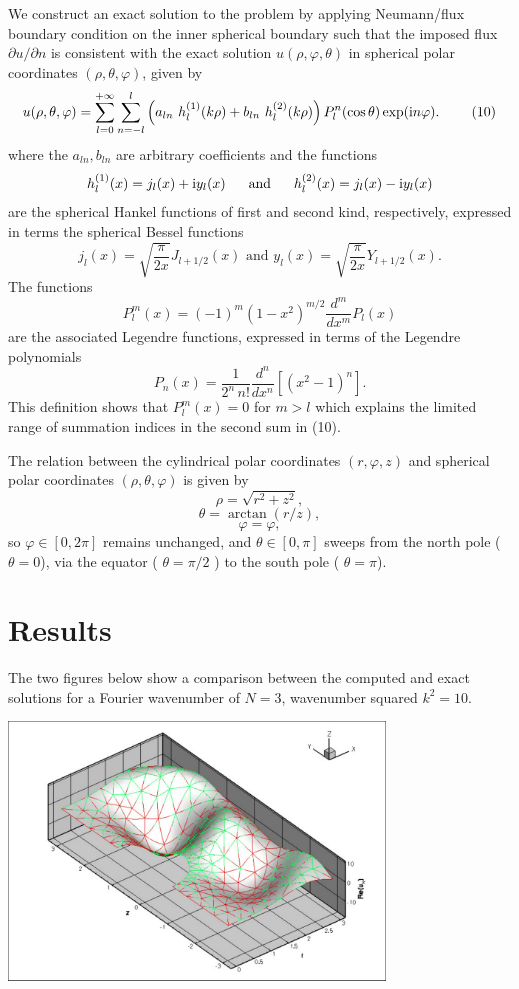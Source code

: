 We construct an exact solution to the problem by applying Neumann/flux boundary condition on the inner spherical boundary such that the imposed flux $ \partial u/\partial n $ is consistent with the exact solution $ u(\rho,\varphi,\theta) $ in spherical polar coordinates $ (\rho,\theta,\varphi) $, given by \[ u(\rho,\theta,\varphi)= \sum_{l=0}^{+\infty}\sum_{n=-l}^{l} \left( a_{ln} \ h_{l}^{(1)}(k\rho)+ b_{ln} \ h_{l}^{(2)}(k\rho) \right)P_{l}^{n} (\cos\theta)\exp({\rm i} n \varphi). \ \ \ \ \ \ \ (10) \] where the $a_{ln}, b_{ln} $ are arbitrary coefficients and the functions \[ h_{l}^{(1)}(x)=j_{l}(x)+{\rm i} y_{l}(x) \mbox{ \ \ \ \ and \ \ \ \ } h_{l}^{(2)}(x)=j_{l}(x)-{\rm i} y_{l}(x) \] are the spherical Hankel functions of first and second kind, respectively, expressed in terms the spherical Bessel functions \[ j_{l}(x)=\sqrt{\frac{\pi}{2x}}J_{l+1/2}(x) \mbox{ \ \ \ \ and \ \ \ \ } y_{l}(x)=\sqrt{\frac{\pi}{2x}}Y_{l+1/2}(x). \] The functions \[ P_{l}^{m}(x)=(-1)^{m}(1-x^2)^{m/2}\frac{d^m}{dx^m}P_{l}(x) \] are the associated Legendre functions, expressed in terms of the Legendre polynomials \[ P_{n}(x)=\frac{1}{2^{n} \, n!}\frac{d^n}{dx^n}[(x^2-1)^{n}]. \] This definition shows that $ P_{l}^{m}(x)=0 $ for $ m>l $ which explains the limited range of summation indices in the second sum in (10).

The relation between the cylindrical polar coordinates $ (r,\varphi,z)$ and spherical polar coordinates $ (\rho,\theta,\varphi) $ is given by \[ \rho = \sqrt{r^2 + z^2}, \] \[ \theta = \arctan(r/z), \] \[ \varphi = \varphi, \] so $\varphi \in [0,2\pi] $ remains unchanged, and $\theta \in [0,\pi] $ sweeps from the north pole ( $ \theta = 0 $), via the equator ( $ \theta = \pi/2 $ ) to the south pole ( $ \theta = \pi $).



\hypertarget{index_results}{}\section{Results}\label{index_results}
The two figures below show a comparison between the computed and exact solutions for a Fourier wavenumber of $ N = 3 $, wavenumber squared $ k^2 = 10 $.

 
\begin{DoxyImage}
\includegraphics[width=0.75\textwidth]{soln3_real}
\end{DoxyImage}


